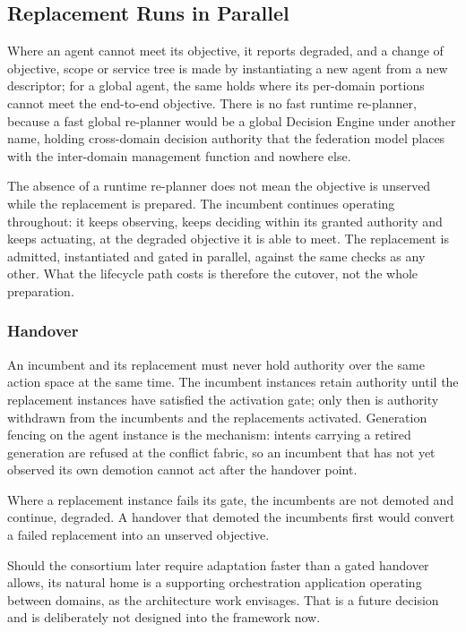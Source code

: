 \hypertarget{replacement-runs-in-parallel}{%
\subsection{Replacement Runs in Parallel}\label{replacement-runs-in-parallel}}

Where an agent cannot meet its objective, it reports degraded, and a
change of objective, scope or service tree is made by instantiating a
new agent from a new descriptor; for a global agent, the same holds
where its per-domain portions cannot meet the end-to-end objective.
There is no fast runtime re-planner, because a fast global re-planner
would be a global Decision Engine under another name, holding
cross-domain decision authority that the federation model places with
the inter-domain management function and nowhere else.

The absence of a runtime re-planner does not mean the objective is
unserved while the replacement is prepared. The incumbent continues
operating throughout: it keeps observing, keeps deciding within its
granted authority and keeps actuating, at the degraded objective it is
able to meet. The replacement is admitted, instantiated and gated in
parallel, against the same checks as any other. What the lifecycle path
costs is therefore the cutover, not the whole preparation.

\hypertarget{handover}{%
\subsubsection{Handover}\label{handover}}

An incumbent and its replacement must never hold authority over the same
action space at the same time. The incumbent instances retain authority
until the replacement instances have satisfied the activation gate; only
then is authority withdrawn from the incumbents and the replacements
activated. Generation fencing on the agent instance is the mechanism:
intents carrying a retired generation are refused at the conflict
fabric, so an incumbent that has not yet observed its own demotion
cannot act after the handover point.

Where a replacement instance fails its gate, the incumbents are not
demoted and continue, degraded. A handover that demoted the incumbents
first would convert a failed replacement into an unserved objective.

Should the consortium later require adaptation faster than a gated
handover allows, its natural home is a supporting orchestration
application operating between domains, as the architecture work
envisages. That is a future decision and is deliberately not designed
into the framework now.

